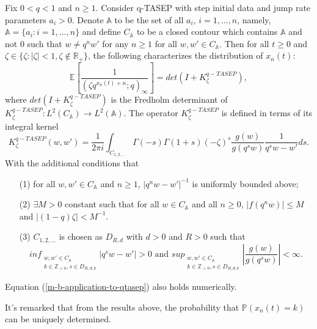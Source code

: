 \begin{theorem}
Fix $0 < q < 1$ and $n \ge 1$. Consider q-TASEP with step initial data and jump rate parameters $a_i > 0$. Denote $\mathbb{A}$ to be the set of all $a_i$, $i = 1, \dots, n$, namely, $\mathbb{A} = \{a_i: i = 1, \dots, n\}$ and define $C_{\mathbb{A}}$ to be a closed contour which contains $\mathbb{A}$ and not $0$ such that $w \neq q^n w'$ for any $n \ge 1$ for all $w, w' \in C_{\mathbb{A}}$. Then for all $t \ge 0$ and $\zeta \in \{\zeta: |\zeta| < 1, \zeta \notin \mathbb{R}_+\}$, the following characterizes the distribution of $x_n(t)$:
\begin{equation}
\label{m-b-application-to-qtasep}
\mathbb{E} \left[ \frac{1}{(\zeta q^{x_n(t)+n}; q)_{\infty}} \right] = det(I+K_{\zeta}^{q-TASEP}),
\end{equation}
where $det(I+K_{\zeta}^{q-TASEP})$ is the Fredholm determinant of $K_{\zeta}^{q-TASEP}: L^2(C_{\mathbb{A}}) \rightarrow L^2(\mathbb{A})$. The operator $K_{\zeta}^{q-TASEP}$ is defined in terms of its integral kernel
$$K_{\zeta}^{q-TASEP}(w,w') = \frac{1}{2 \pi i} \int_{C_{1,2,\dots}} \Gamma(-s) \Gamma(1+s) (-\zeta)^s \frac{g(w)}{g(q^sw)} \frac{1}{q^sw - w'} ds.$$
With the additional conditions that
\begin{enumerate}
\item[(1)] for all $w, w' \in C_{\mathbb{A}}$ and $n \ge 1$, $|q^n w - w'|^{-1}$ is uniformly bounded above;
\item[(2)] $\exists M > 0$ constant such that for all $w \in C_{\mathbb{A}}$ and all $n \ge 0$, $|f(q^n w)| \le M$ and $|(1-q) \zeta| < M^{-1}$.
\item[(3)] $C_{1,2,\dots}$ is chosen as $D_{R,d}$ with $d > 0$ and $R > 0$ such that $$ inf_{\substack{ {w, w' \in C_{\mathbb{A}}} \\ {k \in \mathbb{Z}_{>0}, s \in D_{R, d;k}} }} |q^sw - w'| > 0 \text{ and } sup_{\substack{ {w,w' \in C_{\mathbb{A}}} \\ {k \in \mathbb{Z}_{>0}, s \in D_{R,d;k}} }} \left| \frac{g(w)}{g(q^s w)} \right| < \infty.$$
\end{enumerate}
Equation (\ref{m-b-application-to-qtasep}) also holds numerically.
\end{theorem}

\begin{remark}
It's remarked that from the results above, the probability that $\mathbb{P}(x_n(t) = k)$ can be uniquely determined.
\end{remark}

